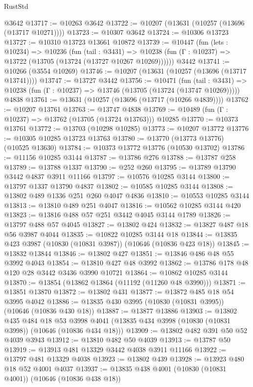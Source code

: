 \begin{lexlean}{RustStd}
\begin{coremodule}
    @3642
@13717 := @10263 @3642
@13722 := @10207 (@13631 (@10257 (@13696 (@13717 @10271))))
@13723 := @10307 @3642
@13724 := @10306 @13723
@13727 := @10310 @13723 @13661 @10872
@13739 := @10447
    (fun (lets : @10234) =>
    @10236
      (fun (tail : @3431) =>
      @10238 (fun (Γ : @10237) => @13722 (@13705 (@13724 (@13727 @10267 @10269))))))
    @3442
@13741 := @10266 (@3554 @10269)
@13746 := @10207 (@13631 (@10257 (@13696 (@13717 @13741))))
@13747 := @13727 @3442
@13756 := @10471
    (fun (tail : @3431) => @10238 (fun (Γ : @10237) => @13746 (@13705 (@13724 (@13747 @10269)))))
    @4838
@13761 := @13631 (@10257 (@13696 (@13717 (@10266 @4839))))
@13762 := @10207 @13761
@13763 := @13747 @4838
@13769 := @10489 (fun (Γ : @10237) => @13762 (@13705 (@13724 @13763))) @10285
@13770 := @10373 @13761
@13772 := @13703 (@10298 @10285)
@13773 := @10207 @13772
@13776 := @10305 @10285 @13723 @13763
@13780 := @13770 (@13773 @13776) (@10525 @13630)
@13784 := @10373 @13772 @13776 (@10530 @13702)
@13786 := @11156 @10285 @3144
@13787 := @13786 @276
@13788 := @13787 @258
@13789 := @13788 @1337
@13790 := @252 @260
@13795 := @13789 @13790 @3442 @4837 @3911 @11166
@13797 := @10576 @10285 @3144
@13800 := @13797 @1337 @13790 @4837
@13802 := @10585 @10285 @3144
@13808 := @13802 @489 @1336 @251 @260 @4047 @4836
@13810 := @10553 @10285 @3144
@13813 := @13810 @489 @251 @4047
@13816 := @10562 @10285 @3144 @420
@13823 := @13816 @488 @57 @251 @3442 @4045 @3144 @1789
@13826 := @13797 @488 @57 @4045
@13827 := @13802 @424
@13832 := @13827 @487 @18 @56 @3987 @4044
@13835 := @10822 @10285 @3144 @18
@13844 := @13835 @423 @3987 (@10830 (@10831 @3987)) (@10646 (@10836 @423 @18))
@13845 := @13832 @13844
@13846 := @13802 @427
@13851 := @13846 @486 @48 @55 @3992 @4043
@13854 := @13810 @427 @48 @3992
@13862 := @13786 @178 @48 @120 @28 @3442 @3436 @3990 @10721
@13864 := @10862 @10285 @3144
@13870 := @13854 (@13862 @13864 (@11192 (@11260 @48 @3990)))
@13871 := @13851 @13870
@13872 := @13802 @431
@13877 := @13872 @485 @18 @54 @3995 @4042
@13886 := @13835 @430 @3995 (@10830 (@10831 @3995)) (@10646 (@10836 @430 @18))
@13887 := @13877 @13886
@13903 := @13802
    @435
    @484
    @18
    @53
    @3998
    @4041
    (@13835 @434 @3998 (@10830 (@10831 @3998)) (@10646 (@10836 @434 @18)))
@13909 := @13802 @482 @391 @50 @52 @4039 @3943
@13912 := @13810 @482 @50 @4039
@13913 := @13787 @50
@13919 := @13913 @481 @13329 @3442 @4038 @3911 @11166
@13922 := @13797 @481 @13329 @4038
@13923 := @13802 @439
@13928 := @13923 @480 @18 @52 @4001 @4037
@13937 := @13835 @438 @4001 (@10830 (@10831 @4001)) (@10646 (@10836 @438 @18))

\end{coremodule}
\end{lexlean}
